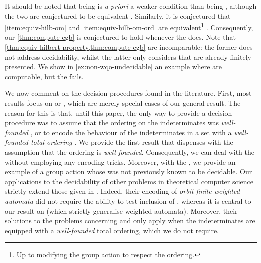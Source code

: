 It should be noted that being  is \emph{a priori}
a weaker condition than being , although the two
are conjectured to be equivalent \cite[Problems 9]{POUZ24}. Similarly, it is
conjectured that \cref{item:equiv-hilb-om} and \cref{item:equiv-hilb-om-ord}
are equivalent\footnote{Up to modifying the group action to respect the
ordering.} \cite[Problems 12]{POUZ24}. Consequently, our
\cref{thm:compute-egb} is conjectured to hold whenever the  does. Note that
\cref{thm:equiv-hilbert-property,thm:compute-egb} are incomparable: the former
does not address decidability, whilst the latter only considers
 that are already finitely presented. We show
in \cref{ex:non-wqo-undecidable} an example where  are computable, but the  fails.

We now comment on the decision procedures found in the literature.
First, most results focus on  or ,
which are merely special cases of our general result. The reason for this is that,
until this paper, the only way to provide a decision procedure was to
assume that the ordering on the indeterminates was \emph{well-founded}
\cite[Section 6]{GHOLAS24}, or to encode the behaviour of the indeterminates in
a set with a \emph{well-founded total ordering} \cite[Section 7, Reduction
Game]{GHOLAS24}. We provide the first result that dispenses with the assumption
that the ordering is \emph{well-founded}. Consequently, we can deal with
the  without employing any encoding tricks. Moreover, with the , we provide an example of a group action whose
 was not previously known to be decidable.
Our applications to the decidability of other problems in theoretical
computer science strictly extend those given in \cite[Section 4, 8, and
9]{GHOLAS24}. Indeed, their encoding of \emph{orbit finite weighted automata}
did not require the ability to test inclusion of , whereas
it is central to our result on  (which
strictly generalise weighted automata). Moreover, their solutions to the
problems concerning  and  only apply when the indeterminates are equipped
with a \emph{well-founded} total ordering, which we do not require.

